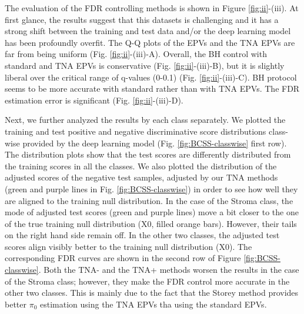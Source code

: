 \documentclass{article}
\begin{document}
The evaluation of the FDR controlling methods is shown in Figure \ref{fig:ii}-(iii). At first glance, the results suggest that this datasets is challenging and it  has a strong shift between the training and test data and/or the deep learning model has been profoundly overfit. The Q-Q plots of the EPVs and the TNA EPVs are far from being uniform (Fig. \ref{fig:ii}-(iii)-A). Overall, the BH control with standard and TNA EPVs is conservative (Fig. \ref{fig:ii}-(iii)-B), but it is slightly liberal over the critical range of q-values (0-0.1) (Fig. \ref{fig:ii}-(iii)-C). BH protocol seems to be more accurate with standard rather than with TNA EPVs. The FDR estimation error is significant (Fig. \ref{fig:ii}-(iii)-D). 

Next, we further analyzed the results by each class separately. We plotted the training and test positive and negative discriminative score distributions class-wise provided by the deep learning model (Fig. \ref{fig:BCSS-classwise} first row). The distribution plots show that the test scores are differently distributed from the training scores in all the classes. We also plotted the distribution of the adjusted scores of the negative test samples, adjusted by our TNA methods (green and purple lines in Fig. \ref{fig:BCSS-classwise}) in order to see how well they are aligned to the training null distribution.  In the case of the Stroma class, the mode of adjusted test scores (green and purple lines) move a bit closer to the one of the true training null distribution (X0, filled orange bars). However, their tails on the right hand side remain off. In the other two classes, the adjusted test scores align visibly better to the training null distribution (X0). The corresponding FDR curves are shown in the second row of Figure \ref{fig:BCSS-classwise}. Both the TNA- and the TNA+ methods worsen the results in the case of the Stroma class; however, they make the FDR control more accurate in the other two classes. This is mainly due to the fact that the Storey method provides better $\pi_0$ estimation using the TNA EPVs tha using the standard EPVs. 
\end{document}
